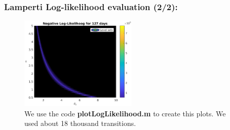 \documentclass[aspectratio=169]{beamer}\usepackage[utf8]{inputenc}
\begin{document}
\begin{frame}\frametitle{Lamperti Log-likelihood evaluation (2/2):}

\begin{figure}[ht!]
\centering
\includegraphics[width=0.5\textwidth]{../Results/likelihood/lamperti/Log-Likelihood.eps}
\caption{We use the code \textbf{plotLogLikelihood.m} to create this plots. We used about 18 thousand transitions.}
\end{figure}

\end{frame}
\end{document}
